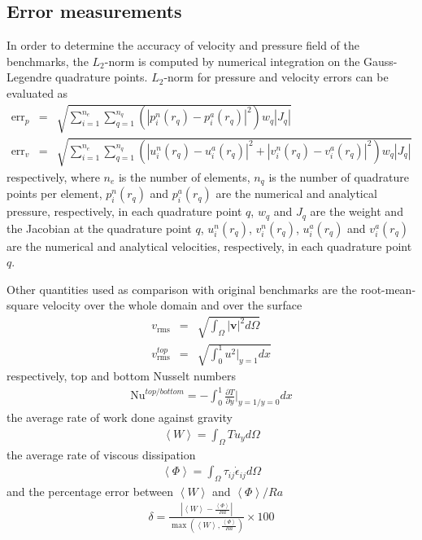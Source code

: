 \subsection{Error measurements}\label{sec:error}
In order to determine the accuracy of velocity and pressure field of the benchmarks, the $L_2$-norm is computed by numerical integration on the Gauss-Legendre
quadrature points. $L_2$-norm for pressure and velocity errors can be evaluated as
\begin{eqnarray}
\label{errp}\textrm{err}_p&=&\sqrt{\sum_{i=1}^{n_e}\sum_{q=1}^{n_q}\left(|p^n_i(r_q)-p^a_i(r_q)|^2\right)w_q|J_q|} \\
\label{errv}\textrm{err}_v&=&\sqrt{\sum_{i=1}^{n_e}\sum_{q=1}^{n_q}\left(|u^n_i(r_q)-u^a_i(r_q)|^2+|v^n_i(r_q)-v^a_i(r_q)|^2\right)w_q|J_q|}
\end{eqnarray}
respectively, where $n_e$ is the number of elements, $n_q$ is the number of quadrature points per element, $p^n_i(r_q)$ and $p^a_i(r_q)$ are the numerical and
analytical pressure, respectively, in each quadrature point $q$, $w_q$  and $J_q$ are the weight and the Jacobian at the quadrature point
$q$, $u^n_i(r_q)$, $v^n_i(r_q)$, $u^a_i(r_q)$ and $v^a_i(r_q)$ are the numerical and analytical velocities, respectively, in each quadrature point $q$.

Other quantities used as comparison with original benchmarks are the root-mean-square velocity over the whole domain and over the surface
\begin{eqnarray}
\label{vrms}v_{\textrm{rms}}&=&\sqrt{\int_{\Omega}|\bm{v}|^2 d\Omega} \\
\label{vrms_top}v_{\textrm{rms}}^{top}&=&\sqrt{\int_0^1 u^2 \bigg|_{y=1} dx}
\end{eqnarray}
respectively, top and bottom Nusselt numbers
\begin{eqnarray}
\label{nu}\textrm{Nu}^{top/bottom}=-\int_0^1\frac{\partial T}{\partial y} \bigg|_{y=1/y=0} dx
\end{eqnarray}
the average rate of work done against gravity
\begin{eqnarray}
\label{w}\left\langle W \right\rangle=\int_{\Omega}T u_y d\Omega
\end{eqnarray}
the average rate of viscous dissipation
\begin{eqnarray}
\label{phi}\left\langle \Phi \right\rangle=\int_{\Omega}\tau_{ij}\dot{\epsilon}_{ij} d\Omega
\end{eqnarray}
and the percentage error between $\left\langle W \right\rangle$ and $\left\langle \Phi \right\rangle/Ra$
\begin{eqnarray}
\label{delta}\delta=\frac{\left|\left\langle W \right\rangle -\frac{\left\langle \Phi \right\rangle}{Ra} \right|}{\max \left(\left\langle W \right\rangle,
\frac{\left\langle \Phi \right\rangle}{Ra}\right)}\times100
\end{eqnarray}